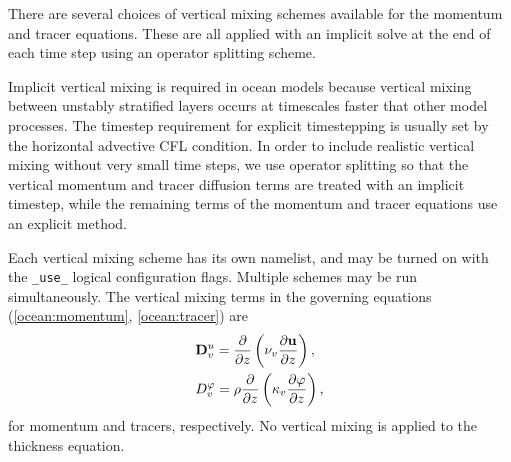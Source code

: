 There are several choices of vertical mixing schemes available for the 
momentum and tracer equations.  These are all applied with an implicit solve at the end of each time step using an operator splitting scheme.  

Implicit vertical mixing is required in ocean models because vertical mixing between unstably stratified layers occurs at timescales faster that other model processes.  The timestep requirement for explicit timestepping is usually set by the horizontal advective CFL condition.  In order to include realistic vertical mixing without very small time steps, we use operator splitting so that the vertical momentum and tracer diffusion terms are treated with an implicit timestep, while the remaining terms of the momentum and tracer equations use an explicit method.

Each vertical mixing scheme has its own namelist, and may be turned
on with the \verb|_use_| logical configuration flags.  Multiple
schemes may be run simultaneously.  The vertical mixing terms in the
governing equations (\ref{ocean:momentum}, \ref{ocean:tracer}) are 
\begin{eqnarray} 
\label{v_mom_diff}
& \displaystyle {\bf D}^u_v=\frac{\partial }{\partial z} 
\left( \nu_v \frac{\partial {\bf u}}{\partial z} \right), \\
\label{v_tr_diff}
& \displaystyle D^\varphi_v = \rho \frac{\partial }{\partial z} 
  \left( \kappa_v \frac{\partial \varphi}{\partial z} \right),
\end{eqnarray}
for momentum and tracers, respectively.  No vertical mixing is applied to the
thickness equation.
